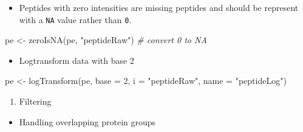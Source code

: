 \documentclass[
]{article}
\newenvironment{Shaded}{\begin{snugshade}}{\end{snugshade}}
\newcommand{\AttributeTok}[1]{\textcolor[rgb]{0.77,0.63,0.00}{#1}}
\newcommand{\CommentTok}[1]{\textcolor[rgb]{0.56,0.35,0.01}{\textit{#1}}}
\newcommand{\DecValTok}[1]{\textcolor[rgb]{0.00,0.00,0.81}{#1}}
\newcommand{\FunctionTok}[1]{\textcolor[rgb]{0.00,0.00,0.00}{#1}}
\newcommand{\NormalTok}[1]{#1}
\newcommand{\OtherTok}[1]{\textcolor[rgb]{0.56,0.35,0.01}{#1}}
\newcommand{\SpecialCharTok}[1]{\textcolor[rgb]{0.00,0.00,0.00}{#1}}
\newcommand{\StringTok}[1]{\textcolor[rgb]{0.31,0.60,0.02}{#1}}
\providecommand{\tightlist}{%
  \setlength{\itemsep}{0pt}\setlength{\parskip}{0pt}}
\begin{document}
\begin{itemize}
\tightlist
\item
  Peptides with zero intensities are missing peptides and should be
  represent with a \texttt{NA} value rather than \texttt{0}.
\end{itemize}

\begin{Shaded}
\begin{Highlighting}[]
\NormalTok{pe }\OtherTok{\textless{}{-}} \FunctionTok{zeroIsNA}\NormalTok{(pe, }\StringTok{"peptideRaw"}\NormalTok{) }\CommentTok{\# convert 0 to NA}
\end{Highlighting}
\end{Shaded}

\begin{itemize}
\tightlist
\item
  Logtransform data with base 2
\end{itemize}

\begin{Shaded}
\begin{Highlighting}[]
\NormalTok{pe }\OtherTok{\textless{}{-}} \FunctionTok{logTransform}\NormalTok{(pe, }\AttributeTok{base =} \DecValTok{2}\NormalTok{, }\AttributeTok{i =} \StringTok{"peptideRaw"}\NormalTok{, }\AttributeTok{name =} \StringTok{"peptideLog"}\NormalTok{)}
\end{Highlighting}
\end{Shaded}

\begin{enumerate}
\def\labelenumi{\arabic{enumi}.}
\setcounter{enumi}{1}
\tightlist
\item
  Filtering
\end{enumerate}

\begin{itemize}
\tightlist
\item
  Handling overlapping protein groups
\end{itemize}

\begin{Shaded}
\end{Shaded}
\end{document}
